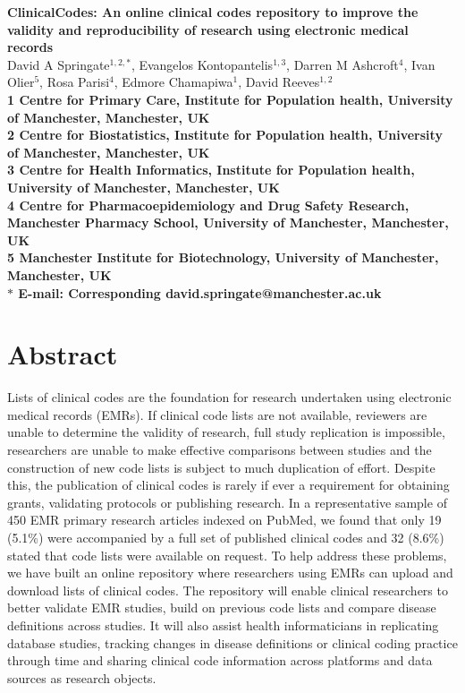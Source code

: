 \documentclass[10pt]{article}
\date{}
\begin{document}
\begin{flushleft}
{\Large
\textbf{ClinicalCodes: An online clinical codes repository to improve the validity and reproducibility of research using electronic medical records}
}
\\
David A Springate$^{1,2,\ast}$, 
Evangelos Kontopantelis$^{1,3}$,
Darren M Ashcroft$^{4}$,
Ivan Olier$^{5}$,
Rosa Parisi$^{4}$,
Edmore Chamapiwa$^{1}$,
David Reeves$^{1,2}$
\\
\bf{1} Centre for Primary Care, Institute for Population health, University of Manchester, Manchester, UK
\\
\bf{2} Centre for Biostatistics, Institute for Population health, University of Manchester, Manchester, UK
\\
\bf{3} Centre for Health Informatics, Institute for Population health, University of Manchester, Manchester, UK
\\
\bf{4} Centre for Pharmacoepidemiology and Drug Safety Research, Manchester Pharmacy School, University of Manchester, Manchester, UK
\\
\bf{5} Manchester Institute for Biotechnology, University of Manchester, Manchester, UK
\\
$\ast$ E-mail: Corresponding david.springate@manchester.ac.uk
\end{flushleft}

\section*{Abstract}

Lists of clinical codes are the foundation for research undertaken using electronic medical records (EMRs). If clinical code lists are not available, reviewers are unable to determine the validity of research, full study replication is impossible, researchers are unable to make effective comparisons between studies and the construction of new code lists is subject to much duplication of effort.  Despite this, the publication of clinical codes is rarely if ever a requirement for obtaining grants, validating protocols or publishing research.  In a representative sample of 450 EMR primary research articles indexed on PubMed, we found that only 19 (5.1\%) were accompanied by a full set of published clinical codes and 32 (8.6\%) stated that code lists were available on request.  To help address these problems, we have built an online repository where researchers using EMRs can upload and download lists of clinical codes. The repository will enable clinical researchers to better validate EMR studies, build on previous code lists and compare disease definitions across studies. It will also assist health informaticians in replicating database studies, tracking changes in disease definitions or clinical coding practice through time and sharing clinical code information across platforms and data sources as research objects.
\end{document}
